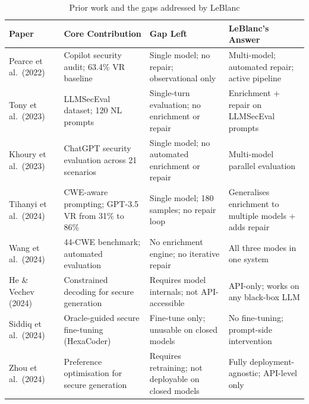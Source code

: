 \documentclass[12pt,a4paper]{report}
\begin{document}
\begin{table}[H]
\centering
\caption{Prior work and the gaps addressed by LeBlanc}
\label{tab:litgap}
\small
\begin{tabularx}{\textwidth}{@{}lXXX@{}}
\toprule
\textbf{Paper} & \textbf{Core Contribution} & \textbf{Gap Left} & \textbf{LeBlanc's Answer} \\
\midrule
Pearce et al.\ (2022)~\cite{pearce2022asleep}
  & Copilot security audit; 63.4\% VR baseline
  & Single model; no repair; observational only
  & Multi-model; automated repair; active pipeline \\[6pt]

Tony et al.\ (2023)~\cite{tony2023llmseceval}
  & LLMSecEval dataset; 120 NL prompts
  & Single-turn evaluation; no enrichment or repair
  & Enrichment + repair on LLMSecEval prompts \\[6pt]

Khoury et al.\ (2023)~\cite{khoury2023secure}
  & ChatGPT security evaluation across 21 scenarios
  & Single model; no automated enrichment or repair
  & Multi-model parallel evaluation \\[6pt]

Tihanyi et al.\ (2024)~\cite{tihanyi2023secucogenicse}
  & CWE-aware prompting; GPT-3.5 VR from 31\% to 86\%
  & Single model; 180 samples; no repair loop
  & Generalises enrichment to multiple models + adds repair \\[6pt]

Wang et al.\ (2024)~\cite{codeseceval2023}
  & 44-CWE benchmark; automated evaluation
  & No enrichment engine; no iterative repair
  & All three modes in one system \\[6pt]

He \& Vechev (2024)~\cite{codeguard2024}
  & Constrained decoding for secure generation
  & Requires model internals; not API-accessible
  & API-only; works on any black-box LLM \\[6pt]

Siddiq et al.\ (2024)~\cite{hexacoder2024}
  & Oracle-guided secure fine-tuning (HexaCoder)
  & Fine-tune only; unusable on closed models
  & No fine-tuning; prompt-side intervention \\[6pt]

Zhou et al.\ (2024)~\cite{lpo2024}
  & Preference optimisation for secure generation
  & Requires retraining; not deployable on closed models
  & Fully deployment-agnostic; API-level only \\
\bottomrule
\end{tabularx}
\end{table}
\end{document}
